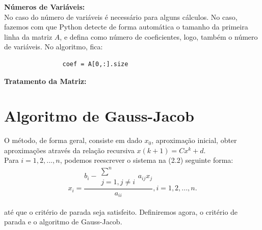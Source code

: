 \documentclass[
12pt,				%
openright,			%
twoside,			%
a4paper,			%
english,			%
french,				%
spanish,			%
brazil				%
]{abntex2_new}
\begin{document}
\begin{alineas}
{			}
			
			\item{\textbf{Números de Variáveis:}\\
				No caso do número de variáveis é necessário para alguns cálculos. No caso,
				fazemos 
				com que Python detecte de forma automática o tamanho da primeira linha da matriz
				$A$, 
				e defina como número de coeficientes, logo, também o número de variáveis. No
				algoritmo, fica:
				\begin{lstlisting}
				coef = A[0,:].size\end{lstlisting}
			}
			
			\item{\textbf{Tratamento da Matriz:}\\
				
				
			}
			
		\end{alineas}
		
		
		

		
		\section{Algoritmo de Gauss-Jacob}
		O método, de forma geral, consiste em dado $x_0$, aproximação inicial, 
		obter aproximações através da relação recursiva $x{(k+1)}=Cx^k + d$.\\
		Para $i = 1,2,...,n$, podemos reescrever o sistema na (2.2) seguinte forma:\\
		$$x_i = \frac{b_i - \substack{\sum^{n} \\j=1,j \neq i}a_{ij}x_j}{a_{ii}}, i =
		1,2,...,n.$$\\
		até que o critério de parada seja satisfeito. Definiremos agora, o critério de
		parada e o 
		algoritmo de Gauss-Jacob.
		
\end{document}
